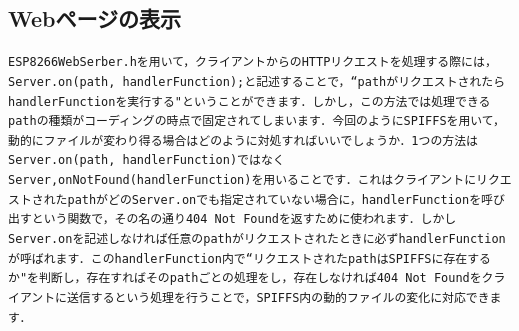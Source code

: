 \subsection{Webページの表示}
\tt{ESP8266WebSerber.h}\rm{}を用いて，クライアントからのHTTPリクエストを処理する際には，\tt{Server.on(path, handlerFunction);}\rm{}と記述することで，``\tt{path}\rm{}がリクエストされたら\tt{handlerFunction}\rm{}を実行する"ということができます．しかし，この方法では処理できる\tt{path}\rm{}の種類がコーディングの時点で固定されてしまいます．今回のようにSPIFFSを用いて，動的にファイルが変わり得る場合はどのように対処すればいいでしょうか．1つの方法は\tt{Server.on(path, handlerFunction)}\rm{}ではなく\tt{Server,onNotFound(handlerFunction)}\rm{}を用いることです．これはクライアントにリクエストされた\tt{path}\rm{}がどの\tt{Server.on}\rm{}でも指定されていない場合に，\tt{handlerFunction}\rm{}を呼び出すという関数で，その名の通り404 Not Foundを返すために使われます．しかし\tt{Server.on}\rm{}を記述しなければ任意の\tt{path}\rm{}がリクエストされたときに必ず\tt{handlerFunction}\rm{}が呼ばれます．この\tt{handlerFunction}\rm{}内で``リクエストされた\tt{path}\rm{}はSPIFFSに存在するか"を判断し，存在すればその\tt{path}\rm{}ごとの処理をし，存在しなければ404 Not Foundをクライアントに送信するという処理を行うことで，SPIFFS内の動的ファイルの変化に対応できます．

